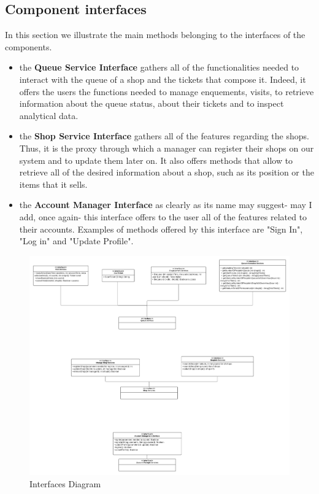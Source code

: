 \subsection{Component interfaces}
\label{subsect:componentinterfaces}

In this section we illustrate the main methods belonging to the interfaces of the components.
\begin{itemize}
    \item the \textbf{Queue Service Interface} gathers all of the functionalities needed to interact with the queue of a shop and the tickets that compose it. 
    Indeed, it offers the users the functions needed to manage enquements, visits, to retrieve information about the queue status, about their tickets and to inspect analytical data.
    \item the \textbf{Shop Service Interface} gathers all of the features regarding the shops. Thus, it is the proxy through which a manager can register their shops on our system and to update them later on. It also offers methods that allow to retrieve all of the desired information about a shop, such as its position or the items that it sells.
    \item the \textbf{Account Manager Interface} as clearly as its name may suggest- may I add, once again- this interface offers to the user all of the features related to their accounts. Examples of methods offered by this interface are "Sign In", "Log in" and "Update Profile".
\end{itemize}

\begin{figure}[h!]
    \centering
    \includegraphics[width=1\textwidth]{Images/InterfacesDiagram.png}
    \caption{\label{fig:InterfacesDiagram}{Interfaces Diagram}}
\end{figure}

